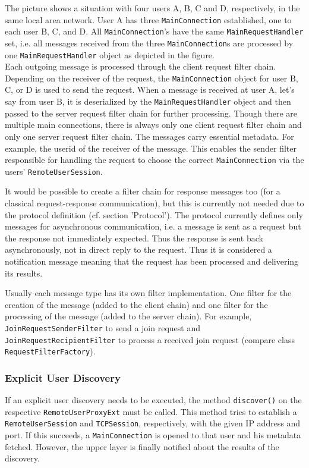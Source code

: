 The picture shows a situation with four users A, B, C and D, respectively, in the same local area network. User A has three \texttt{MainConnection} established, one to each user B, C, and D. All \texttt{MainConnection}'s have the same \texttt{MainRequestHandler} set, i.e. all messages received from the three \texttt{MainConnection}s are processed by one \texttt{MainRequestHandler} object as depicted in the figure. \\
Each outgoing message is processed through the client request filter chain. Depending on the receiver of the request, the \texttt{MainConnection} object for user B, C, or D is used to send the request. When a message is received at user A, let's say from user B, it is deserialized by the \texttt{MainRequestHandler} object and then passed to the server request filter chain for further processing. Though there are multiple main connections, there is always only one client request filter chain and only one server request filter chain. The messages carry essential metadata. For example, the userid of the receiver of the message. This enables the sender filter responsible for handling the request to choose the correct \texttt{MainConnection} via the users' \texttt{RemoteUserSession}.

It would be possible to create a filter chain for response messages too (for a classical request-response communication), but this is currently not needed due to the protocol definition (cf. section 'Protocol'). The protocol currently defines only messages for asynchronous communication, i.e. a message is sent as a request but the response not immediately expected. Thus the response is sent back asynchronously, not in direct reply to the request. Thus it is considered a notification message meaning that the request has been processed and delivering its results.

Usually each message type has its own filter implementation. One filter for the creation of the message (added to the client chain) and one filter for the processing of the message (added to the server chain). For example, \texttt{JoinRequestSenderFilter} to send a join request and \texttt{JoinRequestRecipientFilter} to process a received join request (compare class \texttt{RequestFilterFactory}).


\subsubsection{Explicit User Discovery}
\label{chapter:network.protocol.explicituserdiscovery}
If an explicit user discovery needs to be executed, the method \texttt{discover()} on the respective \texttt{RemoteUserProxyExt} must be called. This method tries to establish a \texttt{RemoteUserSession} and \texttt{TCPSession}, respectively, with the given IP address and port. If this succeeds, a \texttt{MainConnection} is opened to that user and his metadata fetched. However, the upper layer is finally notified about the results of the discovery.



